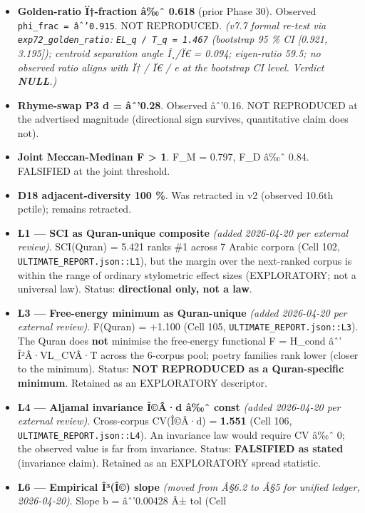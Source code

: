 \documentclass[
]{article}
\providecommand{\tightlist}{%
  \setlength{\itemsep}{0pt}\setlength{\parskip}{0pt}}
\begin{document}
\begin{itemize}
\tightlist
\item
  \textbf{Golden-ratio Ï†-fraction â‰ˆ 0.618} (prior Phase 30). Observed
  \texttt{phi\_frac\ =\ âˆ’0.915}. NOT REPRODUCED. \emph{(v7.7 formal
  re-test via \texttt{exp72\_golden\_ratio}:
  \texttt{EL\_q\ /\ \textbar{}T\_q\textbar{}\ =\ 1.467} (bootstrap 95 \%
  CI {[}0.921, 3.195{]}); centroid separation angle Î¸/Ï€ = 0.094;
  eigen-ratio 59.5; no observed ratio aligns with Ï† / Ï€ / e at the
  bootstrap CI level. Verdict \textbf{NULL}.)}
\item
  \textbf{Rhyme-swap P3 d = âˆ'0.28}. Observed âˆ'0.16. NOT REPRODUCED
  at the advertised magnitude (directional sign survives, quantitative
  claim does not).
\item
  \textbf{Joint Meccan-Medinan F \textgreater{} 1}. F\_M = 0.797, F\_D
  â‰ˆ 0.84. FALSIFIED at the joint threshold.
\item
  \textbf{D18 adjacent-diversity 100 \%}. Was retracted in v2 (observed
  10.6th pctile); remains retracted.
\item
  \textbf{L1 --- SCI as Quran-unique composite} \emph{(added 2026-04-20
  per external review)}. SCI(Quran) = 5.421 ranks \#1 across 7 Arabic
  corpora (Cell 102, \texttt{ULTIMATE\_REPORT.json::L1}), but the margin
  over the next-ranked corpus is within the range of ordinary
  stylometric effect sizes (EXPLORATORY; not a universal law). Status:
  \textbf{directional only, not a law}.
\item
  \textbf{L3 --- Free-energy minimum as Quran-unique} \emph{(added
  2026-04-20 per external review)}. F(Quran) = +1.100 (Cell 105,
  \texttt{ULTIMATE\_REPORT.json::L3}). The Quran does \textbf{not}
  minimise the free-energy functional F = H\_cond âˆ' Î²Â·VL\_CVÂ·T
  across the 6-corpus pool; poetry families rank lower (closer to the
  minimum). Status: \textbf{NOT REPRODUCED as a Quran-specific minimum}.
  Retained as an EXPLORATORY descriptor.
\item
  \textbf{L4 --- Aljamal invariance Î©Â·d â‰ˆ const} \emph{(added
  2026-04-20 per external review)}. Cross-corpus CV(Î©Â·d) =
  \textbf{1.551} (Cell 106, \texttt{ULTIMATE\_REPORT.json::L4}). An
  invariance law would require CV â‰ˆ 0; the observed value is far from
  invariance. Status: \textbf{FALSIFIED as stated} (invariance claim).
  Retained as an EXPLORATORY spread statistic.
\item
  \textbf{L6 --- Empirical Î³(Î©) slope} \emph{(moved from Â§6.2 to Â§5
  for unified ledger, 2026-04-20)}. Slope b = âˆ'0.00428 Â± tol (Cell

\end{itemize}
\end{document}

